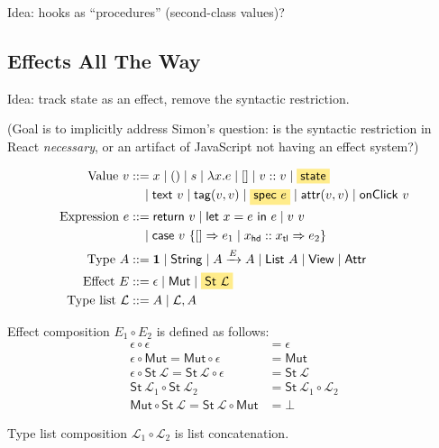 \documentclass{article}
\newcommand{\mf}[1]{\mathsf{#1}}
\newcommand{\mc}[1]{\mathcal{#1}}
\newcommand{\mb}[1]{\mathbf{#1}}
\newcommand{\mhl}[1]{\colorbox{LightGoldenrod1}{$#1$}}
\newcommand{\arrow}[1]{\xrightarrow{#1}}
\newcommand{\ptp}{A}
\newcommand{\tone}{\mb{1}}
\newcommand{\tstr}{\mf{String}}
\newcommand{\tview}{\mf{View}}
\newcommand{\tattr}{\mf{Attr}}
\newcommand{\vtxt}[1]{\mf{text}\ #1}
\newcommand{\vtag}[2]{\mf{tag}(#1, #2)}
\newcommand{\vattr}[2]{\mf{attr}(#1, #2)}
\newcommand{\vclick}[1]{\mf{onClick}\ #1}
\newcommand{\Ell}{\mc{L}}
\newcommand{\elet}[3]{\mf{let}\ #1 = #2\ \mf{in}\ #3}
\newcommand{\eret}[1]{\mf{return}\ #1}
\newcommand{\ecase}[5]{\mf{case}\ #1\ \{#2 \Rightarrow #3 \mid #4 \Rightarrow #5\}}
\begin{document}
Idea: hooks as ``procedures'' (second-class values)?

\subsection{Effects All The Way}

Idea: track state as an effect,
remove the syntactic restriction.

(Goal is to implicitly address Simon's question:
is the syntactic restriction in React \emph{necessary},
or an artifact of JavaScript not having an effect system?)

\begin{align*}
\text{Value } v &::= x \mid () \mid s 
\mid \lambda x.e \mid [] \mid v :: v \mid \mhl{\mf{state}}\\
&\quad\mid \vtxt{v} \mid \vtag{v}{v} \mid \mhl{\mf{spec}\ e}
\mid \vattr{v}{v} \mid \vclick{v}\\
\text{Expression } e &::= \eret{v} \mid \elet{x}{e}{e} \mid v\ v\\
&\quad\mid \ecase{v}{[]}{e_1}{x_\mf{hd} :: x_\mf{tl}}{e_2}\\
\text{Type } \ptp &::= \tone \mid \tstr \mid \ptp \arrow{E} \ptp
\mid \mf{List}\ A \mid \tview \mid \tattr\\
\text{Effect } E &::= \epsilon \mid \mf{Mut} \mid \mhl{\mf{St}\ \Ell}\\
\text{Type list } \Ell &::= A \mid \Ell, A
\end{align*}

Effect composition $E_1 \circ E_2$ is defined as follows:
\begin{align*}
\epsilon \circ \epsilon &= \epsilon\\
\epsilon \circ \mf{Mut} = \mf{Mut} \circ \epsilon &= \mf{Mut}\\
\epsilon \circ \mf{St}\ \Ell = \mf{St}\ \Ell \circ \epsilon &= \mf{St}\ \Ell\\
\mf{St}\ \Ell_1 \circ \mf{St}\ \Ell_2 &= \mf{St}\ \Ell_1 \circ \Ell_2\\
\mf{Mut} \circ \mf{St}\ \Ell = \mf{St}\ \Ell \circ \mf{Mut} &= \bot
\end{align*}

Type list composition $\Ell_1 \circ \Ell_2$ is list concatenation.
\end{document}
